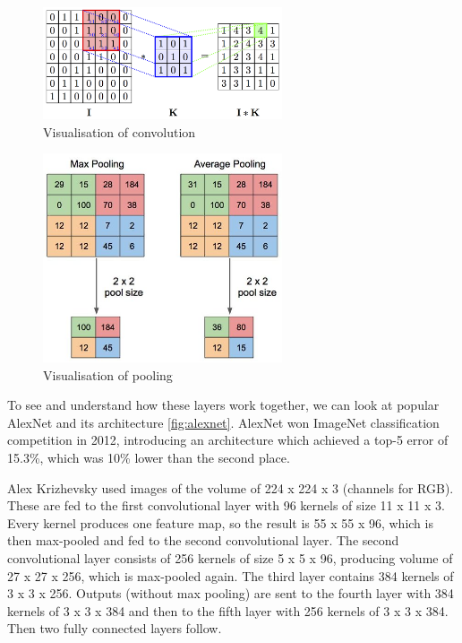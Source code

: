\begin{figure}[ht]
    \centering
    \includegraphics[width=200pt]{images/convolution-image.png}
    \caption{Visualisation of convolution}
    \label{fig:convolution-image}
\end{figure}

\begin{figure}[ht]
    \centering
    \includegraphics[width=200pt]{images/pooling.jpg}
    \caption{Visualisation of pooling}
    \label{fig:pooling-image}
\end{figure}

To see and understand how these layers work together, we can look at popular AlexNet \cite{alexnet2012} and its architecture \ref{fig:alexnet}. AlexNet won ImageNet classification competition in 2012, introducing an architecture which achieved a top-5 error of 15.3\%, which was 10\% lower than the second place.

Alex Krizhevsky used images of the volume of 224 x 224 x 3 (channels for RGB). These are fed to the first convolutional layer with 96 kernels of size 11 x 11 x 3. Every kernel produces one feature map, so the result is 55 x 55 x 96, which is then max-pooled and fed to the second convolutional layer. The second convolutional layer consists of 256 kernels of size 5 x 5 x 96, producing volume of 27 x 27 x 256, which is max-pooled again. The third layer contains 384 kernels of 3 x 3 x 256. Outputs (without max pooling) are sent to the fourth layer with 384 kernels of 3 x 3 x 384 and then to the fifth layer with 256 kernels of 3 x 3 x 384. Then two fully connected layers follow.

